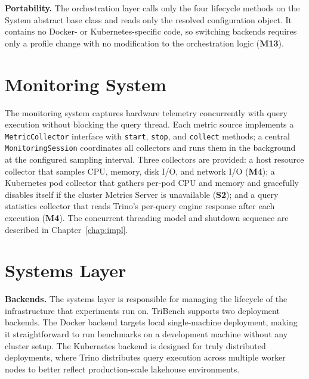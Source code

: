 \documentclass{l4proj}
\begin{document}
\textbf{Portability.} The orchestration layer calls only the four lifecycle methods on the System abstract base class and reads only the resolved configuration object. It contains no Docker- or Kubernetes-specific code, so switching backends requires only a profile change with no modification to the orchestration logic (\textbf{M13}).

\section{Monitoring System}
\label{sec:monitoring_system}

The monitoring system captures hardware telemetry concurrently with query execution without blocking the query thread. Each metric source implements a \texttt{MetricCollector} interface with \texttt{start}, \texttt{stop}, and \texttt{collect} methods; a central \texttt{MonitoringSession} coordinates all collectors and runs them in the background at the configured sampling interval. Three collectors are provided: a host resource collector that samples CPU, memory, disk I/O, and network I/O (\textbf{M4}); a Kubernetes pod collector that gathers per-pod CPU and memory and gracefully disables itself if the cluster Metrics Server is unavailable (\textbf{S2}); and a query statistics collector that reads Trino's per-query engine response after each execution (\textbf{M4}). The concurrent threading model and shutdown sequence are described in Chapter~\ref{chap:impl}.




\section{Systems Layer}
\label{sec:systems_layer}

\textbf{Backends.} The systems layer is responsible for managing the lifecycle of the infrastructure that experiments run on. TriBench supports two deployment backends. The Docker backend targets local single-machine deployment, making it straightforward to run benchmarks on a development machine without any cluster setup. The Kubernetes backend is designed for truly distributed deployments, where Trino distributes query execution across multiple worker nodes to better reflect production-scale lakehouse environments.
\end{document}
